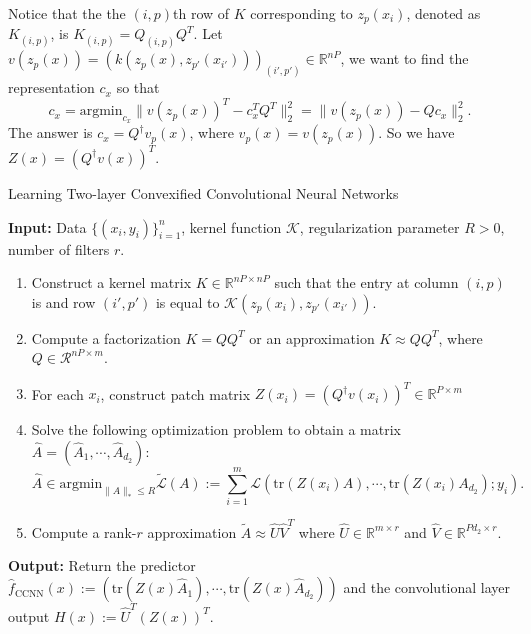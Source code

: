 \documentclass{article}
\renewcommand{\algorithmicrequire}{\textbf{Input:}}
\renewcommand{\algorithmicensure}{\textbf{Output:}}
\begin{document}
Notice that the the $(i,p)$th row of $K$ corresponding to $z_p(x_i)$, denoted as $K_{(i,p)}$, is $K_{(i,p)}=Q_{(i,p)}Q^T$. Let $v(z_p(x))=(k(z_p(x),z_{p'}(x_{i'})))_{(i',p')}\in\mathbb{R}^{nP}$, we want to find the representation $c_x$ so that
\[c_x=\text{argmin}_{c_x}\|v(z_p(x))^T-c_x^TQ^T\|_2^2=\|v(z_p(x))-Qc_x\|_2^2.\]
The answer is $c_x=Q^\dagger v_p(x)$, where $v_p(x)=v(z_p(x))$. So we have $Z(x)=(Q^\dagger v(x))^T$.

\begin{algorithm}
\caption{Learning Two-layer Convexified Convolutional Neural Networks}\label{euclid}
\algorithmicrequire{ Data $\lbrace(x_i,y_i)\rbrace_{i=1}^n$, kernel function $\mathcal{K	}$, regularization parameter $R>0$, number of filters $r$.}
\begin{enumerate}
\item Construct a kernel matrix $K\in\mathbb{R}^{nP\times nP}$ such that the entry at column $(i,p)$ is and row $(i',p')$ is equal to $\mathcal{K}(z_p(x_i),z_{p'}(x_{i'}))$.
\item Compute a factorization $K=QQ^T$ or an approximation  $K\approx QQ^T$, where $Q\in\mathcal{R}^{nP\times m}$.
\item For each $x_i$, construct patch matrix $Z(x_i)=(Q^\dagger v(x_i))^T\in\mathbb{R}^{P\times m}$
\item Solve the following optimization problem to obtain a matrix $\widehat{A}=(\widehat{A}_1,\cdots,\widehat{A}_{d_2})$:
\[\widehat{A}\in\text{argmin}_{\|A\|_*\leq R}\tilde{\mathcal{L}}(A):=\sum_{i=1}^m\mathcal{L}(\text{tr}(Z(x_i)A),\cdots,\text{tr}(Z(x_i)A_{d_2});y_i).\]
\item Compute a rank-$r$ approximation $\tilde{A}\approx\widehat{U}\widehat{V}^T$ where $\widehat{U}\in\mathbb{R}^{m\times r}$ and $\widehat{V}\in\mathbb{R}^{Pd_2\times r}$.
\end{enumerate}
\algorithmicensure{ Return the predictor $\widehat{f}_{\text{CCNN}}(x):=(\text{tr}(Z(x)\widehat{A}_1),\cdots,\text{tr}(Z(x)\widehat{A}_{d_2}))$ and the convolutional layer output $H(x):=\widehat{U}^T(Z(x))^T$.}
\end{algorithm}



\end{document}

